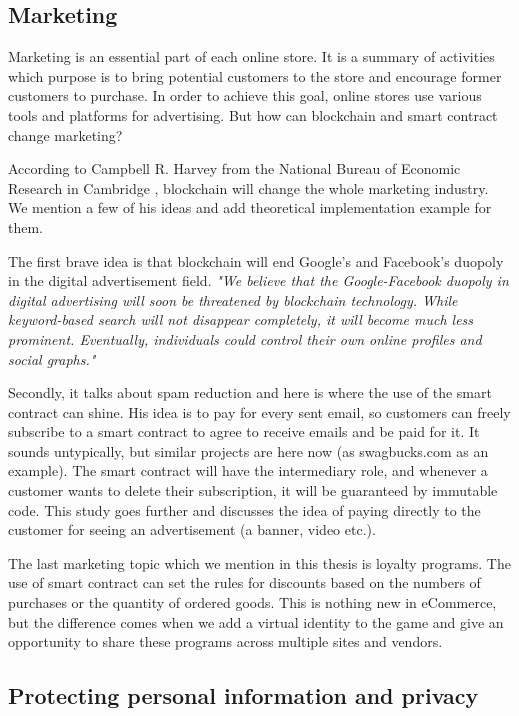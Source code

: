 \documentclass[thesis=M,english]{FITthesis}[2019/12/23]
\begin{document}
    
\subsection{Marketing}
Marketing is an essential part of each online store. It is a summary of activities which purpose is to bring potential customers to the store and encourage former customers to purchase. In order to achieve this goal, online stores use various tools and platforms for advertising. But how can blockchain and smart contract change marketing?

According to Campbell R. Harvey from the National Bureau of Economic Research in Cambridge \cite{blockChainMarketing}, blockchain will change the whole marketing industry. We mention a few of his ideas and add theoretical implementation example for them.

The first brave idea is that blockchain will end Google's and Facebook's duopoly in the digital advertisement field. \emph{"We believe that the Google-Facebook duopoly in digital advertising will soon be threatened by blockchain technology. While keyword-based search will not disappear completely, it will become much less prominent. Eventually, individuals could control their own online profiles and social graphs."}\cite{blockChainMarketing} 

Secondly, it talks about spam reduction and here is where the use of the smart contract can shine. His idea is to pay for every sent email, so customers can freely subscribe to a smart contract to agree to receive emails and be paid for it. It sounds untypically, but similar projects are here now (as swagbucks.com as an example). The smart contract will have the intermediary role, and whenever a customer wants to delete their subscription, it will be guaranteed by immutable code. This study goes further and discusses the idea of paying directly to the customer for seeing an advertisement (a banner, video etc.).

The last marketing topic which we mention in this thesis is loyalty programs. The use of smart contract can set the rules for discounts based on the numbers of purchases or the quantity of ordered goods. This is nothing new in eCommerce, but the difference comes when we add a virtual identity to the game and give an opportunity to share these programs across multiple sites and vendors.

\subsection{Protecting personal information and privacy}
\end{document}
